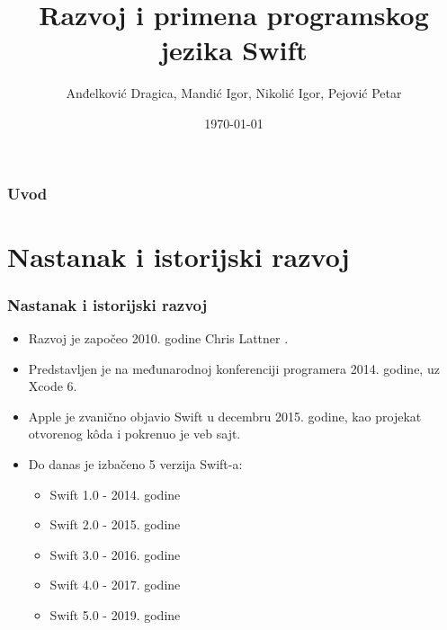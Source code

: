 \documentclass{beamer}
\title[]{Razvoj i primena programskog jezika Swift} %
\author[]{Anđelković Dragica, Mandić Igor, Nikolić Igor, Pejović  Petar} %
\institute[Matf] %
{
Matematički fakultet \\ %
\medskip
\textit{andjelkovic.dragica96@gmail.com, igormandic996@gmail.com, \\ igor.nikolic032@hotmail.com, petar.pejovic8@gmail.com} %
}
\date{\today} %
\begin{document}
\begin{frame}
\titlepage %
\end{frame}

\begin{frame}
\frametitle{Uvod} %
\tableofcontents %





\end{frame}
\section{Nastanak i istorijski razvoj}
\begin{frame}
\frametitle{Nastanak i istorijski razvoj}
\begin{itemize}
\item  Razvoj je započeo 2010. godine Chris Lattner \cite{mastering_swift3}.
\item  Predstavljen je na međunarodnoj konferenciji programera 2014. godine, uz  Xcode 6\cite{thenextweb_sajt}.
\item Apple je zvanično objavio Swift u decembru 2015. godine, kao projekat otvorenog k\^{o}da i pokrenuo je veb sajt.
\item Do danas je izbačeno 5 verzija Swift-a:
\begin{itemize}
\item{Swift 1.0} - 2014. godine
\item{Swift 2.0} - 2015. godine
\item{Swift 3.0} - 2016. godine
\item{Swift 4.0} - 2017. godine
\item{Swift 5.0} - 2019. godine
\end{itemize}
\end{itemize}

\end{frame}
\end{document}
